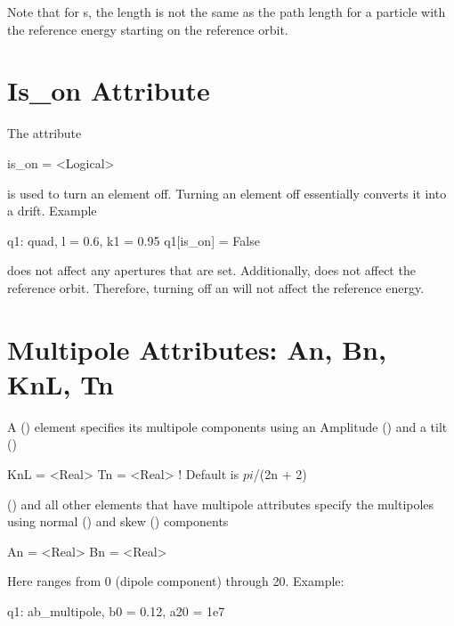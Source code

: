 Note that for s,
the length  is not the same as the path length for a particle
with the reference energy starting on the reference orbit.

\section{Is_on Attribute}
\label{s:is.on}

The  attribute
\begin{example}
  is_on = <Logical>
\end{example}
is used to turn an element off. Turning
an element off essentially converts it into a drift.
Example
\begin{example}
  q1: quad, l = 0.6, k1 = 0.95
  q1[is_on] = False
\end{example}

 does not affect any apertures that are set. Additionally,
 does not affect the reference orbit. Therefore, turning 
off an  will not affect the reference energy.

\section{Multipole Attributes: An, Bn, KnL, Tn}
\label{s:multip}

A  () element specifies its multipole
components using an Amplitude () and a tilt ()
\begin{example}
  KnL = <Real>
  Tn  = <Real>  ! Default is $pi$/(2n + 2)
\end{example}
 () and all other elements that
have multipole attributes specify the multipoles using normal
() and skew () components 
\begin{example}
  An = <Real>
  Bn = <Real>
\end{example}
Here  ranges from 0
(dipole component) through 20. Example:
\begin{example}
  q1: ab_multipole, b0 = 0.12, a20 = 1e7
\end{example}

